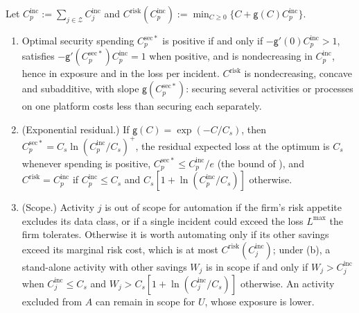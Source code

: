 \begin{proposition}\label{prop:tasks-security}
Let $C^{\mathrm{inc}}_p:=\sum_{j\in\mathcal Z}C^{\mathrm{inc}}_j$ and $C^{\mathrm{risk}}(C^{\mathrm{inc}}_p):=\min_{C\ge 0}\{C+\mathsf g(C)C^{\mathrm{inc}}_p\}$.
\begin{enumerate}
\item[(a)] Optimal security spending $C^{\mathrm{sec}*}_p$ is positive if and only if $-\mathsf g'(0)C^{\mathrm{inc}}_p>1$, satisfies $-\mathsf g'(C^{\mathrm{sec}*}_p)C^{\mathrm{inc}}_p=1$ when positive, and is nondecreasing in $C^{\mathrm{inc}}_p$, hence in exposure and in the loss per incident. $C^{\mathrm{risk}}$ is nondecreasing, concave and subadditive, with slope $\mathsf g(C^{\mathrm{sec}*}_p)$: securing several activities or processes on one platform costs less than securing each separately.
\item[(b)] (Exponential residual.) If $\mathsf g(C)=\exp(-C/C_s)$, then $C^{\mathrm{sec}*}_p=C_s\ln(C^{\mathrm{inc}}_p/C_s)^+$, the residual expected loss at the optimum is $C_s$ whenever spending is positive, $C^{\mathrm{sec}*}_p\le C^{\mathrm{inc}}_p/e$ (the bound of \citealp{gordon2002economics}), and $C^{\mathrm{risk}}=C^{\mathrm{inc}}_p$ if $C^{\mathrm{inc}}_p\le C_s$ and $C_s[1+\ln(C^{\mathrm{inc}}_p/C_s)]$ otherwise.
\item[(c)] (Scope.) Activity $j$ is out of scope for automation if the firm's risk appetite excludes its data class, or if a single incident could exceed the loss $L^{\max}$ the firm tolerates. Otherwise it is worth automating only if its other savings exceed its marginal risk cost, which is at most $C^{\mathrm{risk}}(C^{\mathrm{inc}}_j)$; under (b), a stand-alone activity with other savings $W_j$ is in scope if and only if $W_j>C^{\mathrm{inc}}_j$ when $C^{\mathrm{inc}}_j\le C_s$ and $W_j>C_s[1+\ln(C^{\mathrm{inc}}_j/C_s)]$ otherwise. An activity excluded from $A$ can remain in scope for $U$, whose exposure is lower.
\end{enumerate}
\end{proposition}

